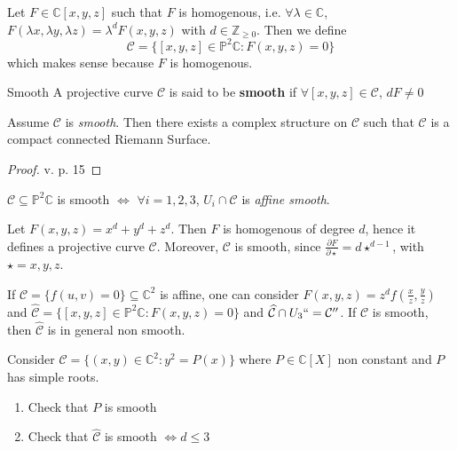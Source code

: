 Let \(F \in  \mathbb{C}[x, y, z]\) such that \(F\) is homogenous, i.e. \(\forall
\lambda \in \mathbb{C}\), \(F{(\lambda x, \lambda y, \lambda z)} =
\lambda^{d}F{(x, y, z)}\) with \(d \in \mathbb{Z}_{\ge 0} \). Then we define
\[
    \mathcal{C} = \{[x, y, z] \in \mathbb{P}^2 \mathbb{C} : F{(x, y, z)} = 0\} 
\]
which makes sense because \(F\) is homogenous.

\begin{definition}{Smooth}
    A projective curve \(\mathcal{C}\) is said to be \textbf{smooth} if
    \(\forall [x, y, z] \in \mathcal{C}\), \(dF \neq 0\) 
\end{definition}

\begin{theorem}{}
    Assume \(\mathcal{C}\) is \emph{smooth}. Then there exists a complex
    structure on \(\mathcal{C}\) such that \(\mathcal{C}\) is a compact
    connected Riemann Surface. 
\end{theorem}

\begin{proof}{}
    v. \cite{miranda} p. 15
\end{proof}

\begin{eser}{}
    \(\mathcal{C} \subseteq \mathbb{P}^2 \mathbb{C} \) is smooth
    \(\iff\) \(\forall i=1,2,3\), \(U_{i} \cap \mathcal{C}\) is \emph{affine
    smooth}.
\end{eser}

\begin{example}{}
    Let \(F{(x, y, z)} = x^{d} + y^{d} + z^{d}\). Then \(F\) is homogenous of
    degree \(d\), hence it defines a projective curve \(\mathcal{C}\).
    Moreover, \(\mathcal{C}\) is smooth, since \(\frac{\partial F}{\partial
    \star} = d \star^{d-1}\), with \(\star = x, y, z\).
\end{example}

\begin{remark}{}
    If \(\mathcal{C} = \{f{(u, v)} = 0\} \subseteq \mathbb{C}^2 \) is affine,
    one can consider \(F{(x, y, z)} = z^{d} f{(\frac{x}{z}, \frac{y}{z})}\) and
    \(\widehat{\mathcal{C}} = \{[x, y, z] \in \mathbb{P}^2 \mathbb{C} : F{(x, y,
    z)} = 0\} \) and \(\widehat{\mathcal{C}} \cap U_{3} ``= \mathcal{C}''\). If
    \(\mathcal{C}\) is smooth, then \(\widehat{\mathcal{C}}\) is in general non
    smooth.
\end{remark}

\begin{eser}{}
    Consider \(\mathcal{C} = \{{(x,y)} \in \mathbb{C}^2 : y^2 = P{(x)}\} \)
    where \(P \in \mathbb{C}[X]\) non constant and \(P\) has simple roots.
\begin{enumerate}[label = \arabic*.]
    \item Check that \(P\) is smooth
    \item Check that \(\widehat{\mathcal{C}}\) is smooth \(\iff d \le 3\) 
\end{enumerate}

\end{eser}

